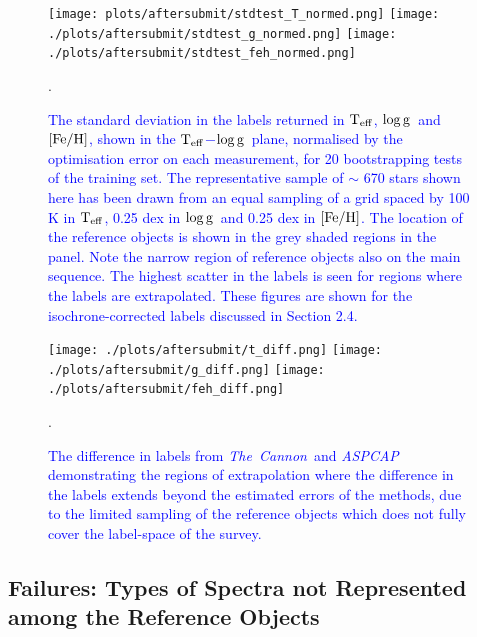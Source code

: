 \documentclass[12pt, preprint]{aastex}
\newcommand{\tc}{\textsl{The~Cannon}}
\newcommand{\aspcap}{\textsl{ASPCAP}}
\newcommand{\teff}{\mbox{$\rm T_{eff}$}}
\newcommand{\feh}{\mbox{$\rm [Fe/H]$}}
\newcommand{\logg}{\mbox{$\rm \log g$}}
\begin{document}
\begin{figure}[!h]
\centering
  \texttt{[image: plots/aftersubmit/stdtest\_T\_normed.png]}
    \texttt{[image: ./plots/aftersubmit/stdtest\_g\_normed.png]}
    \texttt{[image: ./plots/aftersubmit/stdtest\_feh\_normed.png]}
    \caption{\textcolor{blue}{The standard deviation in the labels returned in \teff, \logg\ and \feh, shown in the \teff$-$\logg\ plane, normalised by the optimisation error on each measurement, for 20 bootstrapping tests of the training set. The representative sample of $\sim$ 670 stars shown here has been drawn from an equal sampling of a grid spaced by 100 K in \teff, 0.25 dex in \logg\ and 0.25 dex in \feh. The location of the reference objects is shown in the grey shaded regions in the panel. Note the narrow region of reference objects also on the main sequence. The highest scatter in the labels is seen for regions where the labels are extrapolated. These figures are shown for the isochrone-corrected labels discussed in Section 2.4.}}
    \label{fig:sigma}.
\end{figure}



\begin{figure}[!h]
\centering
  \texttt{[image: ./plots/aftersubmit/t\_diff.png]}
    \texttt{[image: ./plots/aftersubmit/g\_diff.png]}
    \texttt{[image: ./plots/aftersubmit/feh\_diff.png]}
    \caption{\textcolor{blue}{The difference in labels from \tc\ and \aspcap\, demonstrating the regions of extrapolation where the difference in the labels extends beyond the estimated errors of the methods, due to the limited sampling of the reference objects which does not fully cover the label-space of the survey.}}
    \label{fig:sigma2}.
\end{figure}




\subsection{Failures: Types of Spectra not Represented among the Reference Objects}
\label{sec:AnomalousSpectra}
\end{document}
